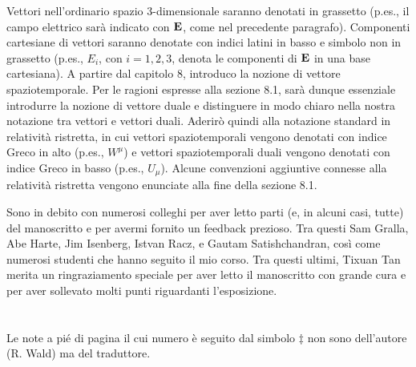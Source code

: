 Vettori nell'ordinario spazio $3$-dimensionale saranno denotati in grassetto (p.es., il campo elettrico sarà indicato con $\vb{E}$, come nel precedente paragrafo). Componenti cartesiane di vettori saranno denotate con indici latini in basso e simbolo non in grassetto  (p.es., $E_i$, con $i=1,2,3$, denota le componenti di $\vb{E}$ in una base cartesiana). A partire dal capitolo 8, introduco la nozione di vettore spaziotemporale. Per le ragioni espresse alla sezione 8.1, sarà dunque essenziale introdurre la nozione di vettore duale e distinguere in modo chiaro nella nostra notazione tra vettori e vettori duali. Aderirò quindi alla notazione standard in relatività ristretta, in cui  vettori spaziotemporali vengono denotati con indice Greco in alto (p.es., $W^{\mu}$) e vettori spaziotemporali duali     
vengono denotati con indice Greco in basso (p.es., $U_{\mu}$). Alcune convenzioni aggiuntive connesse alla relatività ristretta vengono enunciate alla fine della sezione 8.1.

Sono in debito con numerosi colleghi per aver letto parti (e, in alcuni casi, tutte) del manoscritto e per avermi fornito un feedback prezioso. Tra questi Sam Gralla, Abe Harte, Jim Isenberg, Istvan Racz, e Gautam Satishchandran, così come numerosi studenti che hanno seguito il mio corso. Tra questi ultimi, Tixuan Tan merita un ringraziamento speciale per aver letto il manoscritto con grande cura e per aver sollevato molti punti riguardanti l'esposizione.\\
\\ 

\\
Le note a pié di pagina il cui numero è seguito dal simbolo $\ddagger$ non sono dell'autore (R. Wald) ma del traduttore.
